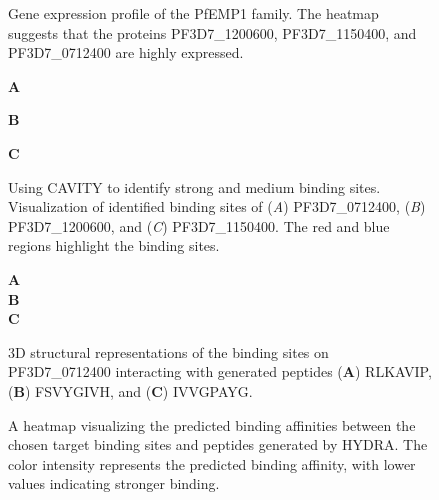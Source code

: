 \begin{figure}
  \center


  \caption{Gene expression profile of the PfEMP1 family. The heatmap suggests that the proteins PF3D7\_1200600, PF3D7\_1150400, and PF3D7\_0712400 are highly expressed.}

  \label{fig:application_2}
\end{figure}

\begin{figure}
  \center

  \textbf{\Large A}

  \textbf{\Large B}

  \textbf{\Large C}

  \caption{Using CAVITY to identify strong and medium binding sites. Visualization of identified binding sites of (\textit{A}) PF3D7\_0712400, (\textit{B}) PF3D7\_1200600, and (\textit{C}) PF3D7\_1150400. The red and blue regions highlight the binding sites.}

  \label{fig:application_3}
\end{figure}

\begin{figure}
  \center

  \textbf{\Large A}
   \\
  \textbf{\Large B}
   \\
  \textbf{\Large C}

  \caption{3D structural representations of the binding sites on PF3D7\_0712400 interacting with generated peptides (\textbf{A}) RLKAVIP, (\textbf{B}) FSVYGIVH, and (\textbf{C}) IVVGPAYG.}

  \label{fig:multi_binding_a}
\end{figure}


\begin{figure}
  \center


  \caption{ A heatmap visualizing the predicted binding affinities between the chosen target binding sites and peptides generated by HYDRA. The color intensity represents the predicted binding affinity, with lower values indicating stronger binding.}

  \label{fig:multi_binding_b}
\end{figure}
